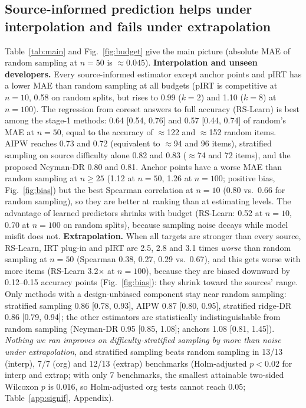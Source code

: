 \documentclass{article}
\begin{document}
\subsection{Source-informed prediction helps under interpolation and fails under extrapolation}
Table~\ref{tab:main} and Fig.~\ref{fig:budget} give the main picture (absolute MAE of random sampling at $n{=}50$ is $\approx0.045$).
\textbf{Interpolation and unseen developers.}
Every source-informed estimator except anchor points and pIRT has a lower MAE than random sampling at all budgets (pIRT is competitive at $n{=}10$, 0.58 on random splits, but rises to 0.99 ($k{=}2$) and 1.10 ($k{=}8$) at $n{=}100$).
The regression from coreset answers to full accuracy (RS-Learn) is best among the stage-1 methods: 0.64 [0.54, 0.76] and 0.57 [0.44, 0.74] of random's MAE at $n{=}50$, equal to the accuracy of $\approx$122 and $\approx$152 random items.
AIPW reaches 0.73 and 0.72 (equivalent to $\approx$94 and 96 items), stratified sampling on source difficulty alone 0.82 and 0.83 ($\approx$74 and 72 items), and the proposed Neyman-DR 0.80 and 0.81.
Anchor points have a worse MAE than random sampling at $n\ge25$ (1.12 at $n{=}50$, 1.26 at $n{=}100$; positive bias, Fig.~\ref{fig:bias}) but the best Spearman correlation at $n{=}10$ (0.80 vs.\ 0.66 for random sampling), so they are better at ranking than at estimating levels.
The advantage of learned predictors shrinks with budget (RS-Learn: 0.52 at $n{=}10$, 0.70 at $n{=}100$ on random splits), because sampling noise decays while model misfit does not.
\textbf{Extrapolation.}
When all targets are stronger than every source, RS-Learn, IRT plug-in and pIRT are 2.5, 2.8 and 3.1 times \emph{worse} than random sampling at $n{=}50$ (Spearman 0.38, 0.27, 0.29 vs.\ 0.67), and this gets worse with more items (RS-Learn 3.2$\times$ at $n{=}100$), because they are biased downward by 0.12--0.15 accuracy points (Fig.~\ref{fig:bias}): they shrink toward the sources' range.
Only methods with a design-unbiased component stay near random sampling: stratified sampling 0.86 [0.78, 0.93], AIPW 0.87 [0.80, 0.95], stratified ridge-DR 0.86 [0.79, 0.94]; the other estimators are statistically indistinguishable from random sampling (Neyman-DR 0.95 [0.85, 1.08]; anchors 1.08 [0.81, 1.45]).
\emph{Nothing we ran improves on difficulty-stratified sampling by more than noise under extrapolation}, and stratified sampling beats random sampling in 13/13 (interp), 7/7 (org) and 12/13 (extrap) benchmarks (Holm-adjusted $p<0.02$ for interp and extrap; with only 7 benchmarks, the smallest attainable two-sided Wilcoxon $p$ is 0.016, so Holm-adjusted org tests cannot reach 0.05; Table~\ref{app:signif}, Appendix).
\end{document}

